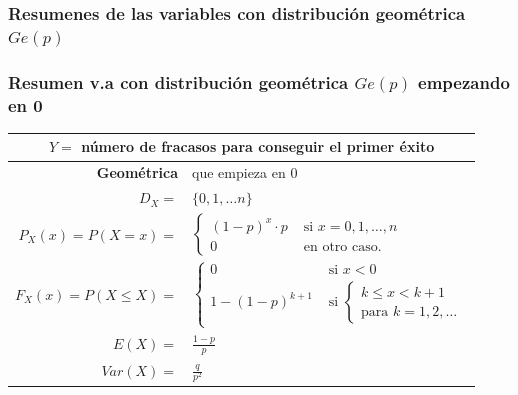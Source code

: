 \documentclass[handout]{beamer}
\renewcommand{\leq}{\leqslant}
\theoremstyle{plain}
\theoremstyle{definition}
\begin{document}
\subsubsection{Resumenes de las variables con  distribución geométrica $Ge(p)$}
\begin{frame}

\frametitle{Resumen v.a con distribución geométrica $Ge(p)$ empezando en 0}
\scriptsize
\setlength{\tabcolsep}{1pt}
\begin{table}
\centering
\begin{tabular}{|rl|}
\hline 
\multicolumn{2}{|c|}{$Y=$ número de fracasos  para conseguir el primer éxito}\\ 
\hline
\hline
\textbf{Geométrica} &  que empieza en 0\\
\hline \hline 
$D_X=$&  $\{0,1,\ldots n\}$ \\\hline 
$P_X(x)=P(X=x)=$ & 
$\left\{
\begin{array}{ll}
  (1-p)^{x}\cdot p & \mbox{ si } x=0,1,\ldots,n\\
     0  & \mbox{ en otro caso.}
     \end{array}\right.$
\\ \hline 
$F_X(x)=P(X\leq X)=$ & $\left\{\begin{array}{ll} 0 & \mbox{ si } x<0\\
  1- (1-p)^{k+1} & \mbox{ si } \left\{ \begin{array}{l}k\leq x< k+1\\\mbox{para } k=1,2,\ldots\end{array}
    \right.\end{array}\right.$ \\\hline 
$E(X)=$ &  $\frac{1-p}{p}$ \\
$Var(X)=$ & $\frac{q}{p^2}$\\
\hline
\end{tabular}
\end{table}
\normalsize

\end{frame}
\end{document}
